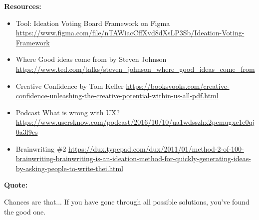 \textbf{Resources:}

\begin{itemize}
\item Tool: Ideation Voting Board Framework on Figma \url{https://www.figma.com/file/nTAWiacCffXvd8dXsLP3Sb/Ideation-Voting-Framework}
\item Where Good ideas come from by Steven Johnson \url{https://www.ted.com/talks/steven_johnson_where_good_ideas_come_from}
\item Creative Confidence by Tom Keller \url{https://booksvooks.com/creative-confidence-unleashing-the-creative-potential-within-us-all-pdf.html}
\item Podcast What is wrong with UX? \url{https://www.usersknow.com/podcast/2016/10/10/ua1wdsszhx2pemugxc1e0qj0a3l9cs}
\item Brainwriting \#2 \url{https://dux.typepad.com/dux/2011/01/method-2-of-100-brainwriting-brainwriting-is-an-ideation-method-for-quickly-generating-ideas-by-asking-people-to-write-thei.html}
\end{itemize}

\textbf{Quote:}

Chances are that... If you have gone through all possible solutions, you've found the good one.


